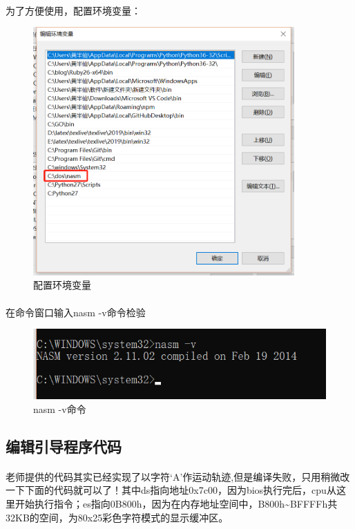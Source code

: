 \documentclass[12pt]{article}
\begin{document}
	\paragraph{}为了方便使用，配置环境变量：
		\begin{figure}[H]
			\centering
			\includegraphics[width=10cm]{./figures/Environemt.png}
			\caption{配置环境变量} 
		\end{figure}	
\vspace*{7pt}
	\paragraph{}在命令窗口输入nasm -v命令检验
		\begin{figure}[H]
			\centering
			\includegraphics[width=14cm]{./figures/cmd.png}
			\caption{nasm -v命令} 
		\end{figure}

	\subsection{\Large 编辑引导程序代码}
	\paragraph{}老师提供的代码其实已经实现了以字符‘A’作运动轨迹,但是编译失败，只用稍微改一下下面的代码就可以了！其中ds指向地址0x7c00，因为bios执行完后，cpu从这里开始执行指令；es指向0B800h，因为在内存地址空间中，B800h\~{}BFFFFh共32KB的空间，为80x25彩色字符模式的显示缓冲区。
\end{document}
